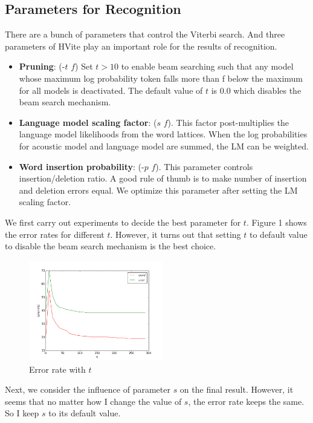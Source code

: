\documentclass{article}
\begin{document}
\subsection{Parameters for Recognition}
There are a bunch of parameters that control the Viterbi search. And three parameters of HVite play an important role for the results of recognition. 
\begin{itemize}
\item \textbf{Pruning}: (-$t$ $f$) Set $t > 10$ to enable beam searching such that any model whose maximum log probability token falls more than f below the maximum for all models is deactivated. The default value of $t$ is $0.0$ which disables the beam search mechanism. 
\item \textbf{Language model scaling factor}: ($s$ $f$). This factor post-multiplies the language model likelihoods from the word lattices. When the log probabilities for acoustic model and language model are summed, the LM can be weighted. 
\item \textbf{Word insertion probability}: (-$p$ $f$). This parameter controls insertion/deletion ratio. A good rule of thumb is to make number of insertion and deletion errors equal. We optimize this parameter after setting the LM scaling factor. 
\end{itemize}
We first carry out experiments to decide the best parameter for $t$. Figure 1 shows the error rates for different $t$. However, it turns out that setting $t$ to default value to disable the beam search mechanism is the best choice. 
\begin{figure}[H]
\begin{center}
  \includegraphics[width=0.52\textwidth]{err_t2.png}
  \caption{Error rate with $t$}\label{err_t}
\end{center}
\end{figure}
Next, we consider the influence of parameter $s$ on the final result. However, it seems that no matter how I change the value of $s$, the error rate keeps the same. So I keep $s$ to its default value. \\
\end{document}
